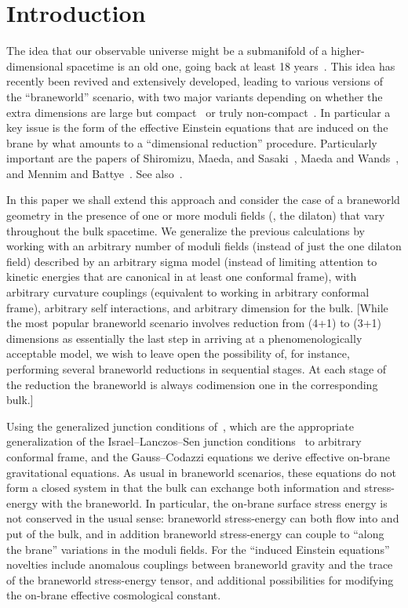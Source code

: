 \documentclass[a4paper,10pt]{article}
\begin{document}
\section{Introduction}
\label{S:introduction}

The idea that our observable universe might be a submanifold of a
higher-dimensional spacetime is an old one, going back at least 18
years~\cite{old-non-compact}. This idea has recently been revived and
extensively developed, leading to various versions of the
``braneworld'' scenario, with two major variants depending on whether
the extra dimensions are large but compact~\cite{large-compact} or
truly non-compact~\cite{RS,Gogberashvili,Arkani-et-al}.  In particular
a key issue is the form of the effective Einstein equations that are
induced on the brane by what amounts to a ``dimensional reduction''
procedure. Particularly important are the papers of Shiromizu, Maeda,
and Sasaki~\cite{Shiromizu}, Maeda and Wands~\cite{Wands}, and Mennim
and Battye~\cite{Mennim}. See also~\cite{background-1,background-2}.


In this paper we shall extend this approach and consider the case of a
braneworld geometry in the presence of one or more moduli fields (\eg,
the dilaton) that vary throughout the bulk spacetime. We generalize
the previous calculations by working with an arbitrary number of
moduli fields (instead of just the one dilaton field) described by an
arbitrary sigma model (instead of limiting attention to kinetic
energies that are canonical in at least one conformal frame), with
arbitrary curvature couplings (equivalent to working in arbitrary
conformal frame), arbitrary self interactions, and arbitrary dimension
for the bulk.  [While the most popular braneworld scenario involves
reduction from (4+1) to (3+1) dimensions as essentially the last step
in arriving at a phenomenologically acceptable model, we wish to leave
open the possibility of, for instance, performing several braneworld
reductions in sequential stages.  At each stage of the reduction the
braneworld is always codimension one in the corresponding bulk.]

Using the generalized junction conditions
of~\cite{generalized-junction}, which are the appropriate
generalization of the Israel--Lanczos--Sen junction
conditions~\cite{Israel-Lanczos-Sen} to arbitrary conformal frame, and
the Gauss--Codazzi equations we derive effective on-brane
gravitational equations.  As usual in braneworld scenarios, these
equations do not form a closed system in that the bulk can exchange
both information and stress-energy with the braneworld.  In
particular, the on-brane surface stress energy is not conserved in the
usual sense: braneworld stress-energy can both flow into and put of
the bulk, and in addition braneworld stress-energy can couple to
``along the brane'' variations in the moduli fields.  For the
``induced Einstein equations'' novelties include anomalous couplings
between braneworld gravity and the trace of the braneworld
stress-energy tensor, and additional possibilities for modifying the
on-brane effective cosmological constant.
\end{document}
